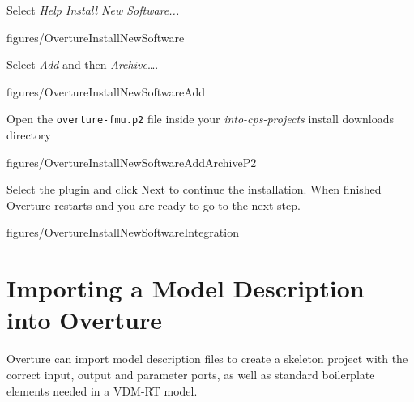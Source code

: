 \documentclass[11pt,a4paper]{../tutorial}
\begin{document}
\begin{instructions}
\item Select \emph{Help \menusep Install New Software...}

\begin{annotation}[width=0.85\linewidth]{figures/OvertureInstallNewSoftware}
\end{annotation}

\item Select \emph{Add} and then \emph{Archive}\ldots.

\begin{annotation}[width=0.85\linewidth,trim=0 260 0 0,clip]{figures/OvertureInstallNewSoftwareAdd}
\end{annotation}

\newpage

\item Open the \verb'overture-fmu.p2' file inside your \emph{into-cps-projects} install downloads directory 
\begin{annotation}[width=0.6\linewidth]{figures/OvertureInstallNewSoftwareAddArchiveP2}
\end{annotation}

\item Select the plugin and click Next to continue the installation. When finished Overture restarts and you are ready to go to the next step. 

\begin{annotation}[width=0.8\linewidth]{figures/OvertureInstallNewSoftwareIntegration}
	
\end{annotation}

\end{instructions}
\newpage


\section{Importing a Model Description into Overture}

Overture can import model description files to create a skeleton project with the correct input, output and parameter ports, as well as standard boilerplate elements needed in a VDM-RT model.
\end{document}

